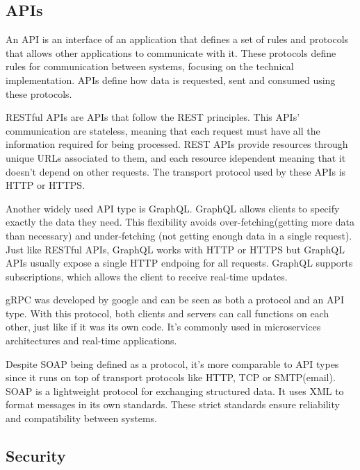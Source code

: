 \subsection{APIs}
An \gls{API} is an interface of an application that defines a set of rules and
protocols that allows other applications to communicate with it.
These protocols define rules for communication between systems, focusing on the
technical implementation. \gls{API}s define how data is requested, sent and
consumed using these protocols.

\gls{REST}ful \gls{API}s are \gls{API}s that follow the \gls{REST} principles.
This \gls{API}s' communication are stateless, meaning that each request must
have all the information required for being processed.
\gls{REST} \gls{API}s provide resources through unique \gls{URL}s associated to them, and
each resource idependent meaning that it doesn't depend on other
requests. The transport protocol used by these \gls{API}s is \gls{HTTP} or \gls{HTTPS}\cite{9101226}.

Another widely used API type is GraphQL.
GraphQL allows clients to specify exactly the data they need. This
flexibility avoids over-fetching(getting more data than necessary) and
under-fetching (not getting enough data in a single request).
Just like \gls{REST}ful \gls{API}s, GraphQL works with \gls{HTTP} or \gls{HTTPS}
but GraphQL \gls{API}s usually expose a single \gls{HTTP} endpoing for all
requests. GraphQL supports subscriptions, which allows the client to receive
real-time updates\cite{9101226}.

\gls{gRPC} was developed by google and can be seen as both a protocol and an
\gls{API} type. With this protocol, both clients and servers can call
functions on each other, just like if it was its own code.
It's commonly used in microservices architectures and real-time applications\cite{newton2024benchmarking}.

Despite \gls{SOAP} being defined as a protocol, it's more comparable to \gls{API}
types since it runs on top of transport protocols like \gls{HTTP}, \gls{TCP} or
\gls{SMTP}(email).
\gls{SOAP} is a lightweight protocol for exchanging structured data. It uses \gls{XML}
to format messages in its own standards. These strict standards ensure
reliability and compatibility between systems\cite{newton2024benchmarking}.

\subsection{Security}


